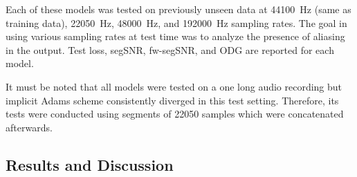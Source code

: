 Each of these models was tested on previously unseen data at \SI{44100}{Hz} (same as training data), \SI{22050}{Hz}, \SI{48000}{Hz}, and \SI{192000}{Hz} sampling rates. The goal in using various sampling rates at test time was to analyze the presence of aliasing in the output. Test loss, \ac{segSNR}, \ac{fw-segSNR}, and \ac{ODG} are reported for each model. 

It must be noted that all models were tested on a one long audio recording but implicit Adams scheme consistently diverged in this test setting. Therefore, its tests were conducted using segments of 22050 samples which were concatenated afterwards.

\subsection{Results and Discussion}
\label{sec:diode_clipper_results}



